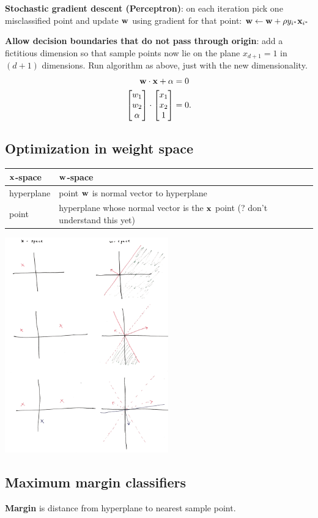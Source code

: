 \documentclass[12pt]{article}
\begin{document}
\textbf{Stochastic gradient descent (Perceptron)}: on each iteration pick one misclassified
point and update $\mathbf w$ using gradient for that point:
$\mathbf w \leftarrow \mathbf w + \rho y_{i^*}\mathbf x_{i^*}$

\textbf{Allow decision boundaries that do not pass through origin}: add a
fictitious dimension so that sample points now lie on the plane $x_{d+1} = 1$
in $(d+1)$ dimensions. Run algorithm as above, just with the new
dimensionality.
\begin{align*}
  \mathbf w \cdot \mathbf x + \alpha &= 0 \\
  \begin{bmatrix}w_1\\w_2\\\alpha\end{bmatrix} \cdot \begin{bmatrix}x_1\\x_2\\1\end{bmatrix} &= 0.
\end{align*}

\subsection*{Optimization in weight space}

\begin{tabular}{l|l}
  $\mathbf x$-space    & $\mathbf w$-space \\
  \hline
  hyperplane & point $\mathbf w$ is normal vector to hyperplane \\
  point      & hyperplane whose normal vector is the $\mathbf x$ point (? don't understand this yet)
\end{tabular}

\includegraphics[width=200pt]{img/ml-perceptron-x-space-w-space.png}

\subsection*{Maximum margin classifiers}
\textbf{Margin} is distance from hyperplane to nearest sample point.
\end{document}
